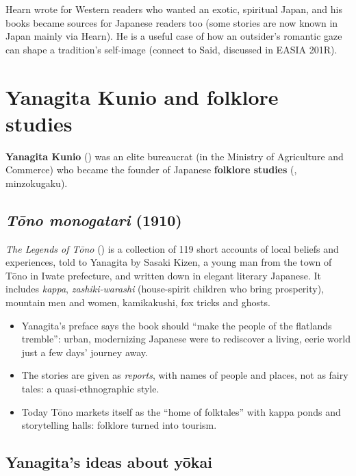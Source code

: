 \begin{important}
Hearn wrote for Western readers who wanted an exotic, spiritual Japan, and his books
became sources for Japanese readers too (some stories are now known in Japan mainly via
Hearn). He is a useful case of how an outsider's romantic gaze can shape a tradition's
self-image (connect to Said, discussed in EASIA 201R).
\end{important}

\section{Yanagita Kunio and folklore studies}

\textbf{Yanagita Kunio} () was an elite bureaucrat (in the Ministry of
Agriculture and Commerce) who became the founder of Japanese \textbf{folklore studies}
(, minzokugaku).

\subsection{\emph{Tōno monogatari} (1910)}

\begin{definition}
\emph{The Legends of Tōno} () is a collection of 119 short accounts of local
beliefs and experiences, told to Yanagita by Sasaki Kizen, a young man from the town of
Tōno in Iwate prefecture, and written down in elegant literary Japanese. It includes
\emph{kappa}, \emph{zashiki-warashi} (house-spirit children who bring prosperity),
mountain men and women, kamikakushi, fox tricks and ghosts.
\end{definition}

\begin{itemize}
  \item Yanagita's preface says the book should ``make the people of the flatlands
        tremble'': urban, modernizing Japanese were to rediscover a living, eerie world
        just a few days' journey away.
  \item The stories are given as \emph{reports}, with names of people and places, not as
        fairy tales: a quasi-ethnographic style.
  \item Today Tōno markets itself as the ``home of folktales'' with kappa ponds and
        storytelling halls: folklore turned into tourism.
\end{itemize}

\subsection{Yanagita's ideas about yōkai}

